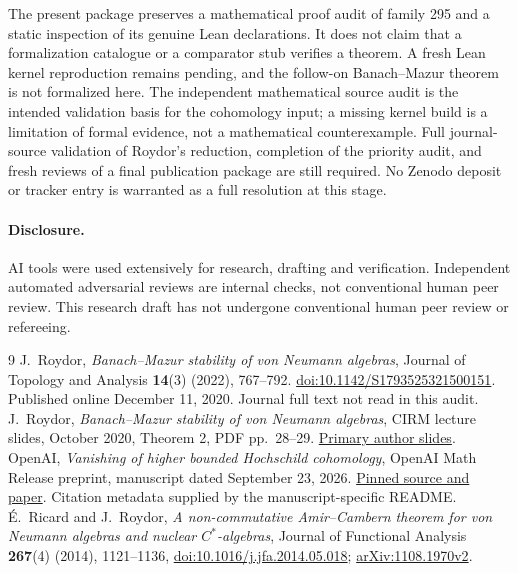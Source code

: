 \documentclass[11pt]{article}
\begin{document}
The present package preserves a mathematical proof audit of family
295 and a static inspection of its genuine Lean declarations. It
does not claim that a formalization catalogue or a comparator stub
verifies a theorem. A fresh Lean kernel reproduction remains pending,
and the follow-on Banach--Mazur theorem is not formalized here.
The independent mathematical source audit is the intended validation
basis for the cohomology input; a missing kernel build is a limitation
of formal evidence, not a mathematical counterexample.
Full journal-source validation of Roydor's reduction, completion of
the priority audit, and fresh reviews of a final publication package
are still required. No Zenodo deposit or tracker entry is warranted
as a full resolution at this stage.

\paragraph{Disclosure.}
AI tools were used extensively for research, drafting and
verification. Independent automated adversarial reviews are internal
checks, not conventional human peer review. This research draft has
not undergone conventional human peer review or refereeing.

\begin{thebibliography}{9}
J.~Roydor, \emph{Banach--Mazur stability of von Neumann algebras},
Journal of Topology and Analysis \textbf{14}(3) (2022), 767--792.
\href{https://doi.org/10.1142/S1793525321500151}{doi:10.1142/S1793525321500151}.
Published online December 11, 2020. Journal full text not read in this audit.
J.~Roydor, \emph{Banach--Mazur stability of von Neumann algebras},
CIRM lecture slides, October 2020, Theorem 2, PDF pp.~28--29.
\href{https://www.cirm-math.fr/RepOrga/2169/Slides/Roydor_Slides.pdf}{Primary author slides}.
OpenAI, \emph{Vanishing of higher bounded Hochschild cohomology},
OpenAI Math Release preprint, manuscript dated September 23, 2026.
\href{https://github.com/openai/math/blob/adc7f1241b42e322a6451854ab7e4b4c146bf78a/preprints/Vanishing-of-higher-bounded-Hochschild-cohomology-September-23-2026/paper.pdf}{Pinned source and paper}.
Citation metadata supplied by the manuscript-specific README.
\'{E}.~Ricard and J.~Roydor, \emph{A non-commutative Amir--Cambern
theorem for von Neumann algebras and nuclear $C^*$-algebras},
Journal of Functional Analysis \textbf{267}(4) (2014), 1121--1136,
\href{https://doi.org/10.1016/j.jfa.2014.05.018}{doi:10.1016/j.jfa.2014.05.018};
\href{https://arxiv.org/abs/1108.1970v2}{arXiv:1108.1970v2}.
\end{thebibliography}
\end{document}
